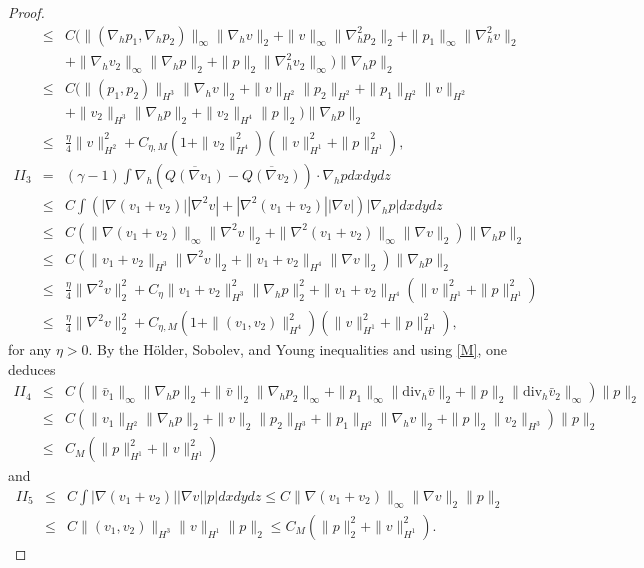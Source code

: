 \documentclass[12pt,reqno]{amsart}
\numberwithin{equation}{section}
\begin{document}
\begin{proof}
\begin{eqnarray*}
    &\leq&C(\|(\nabla_hp_1,\nabla_hp_2)\|_\infty\|\nabla_hv\|_2+\|v\|_\infty\|\nabla_h^2p_2\|_2+\|p_1\|_\infty\|\nabla_h^2v\|_2\\
    &&+\|\nabla_hv_2\|_\infty\|\nabla_hp\|_2+\|p\|_2\|\nabla_h^2v_2\|_\infty)\|\nabla_hp\|_2\\
    &\leq&C(\|(p_1,p_2)\|_{H^3}\|\nabla_hv\|_2+\|v\|_{H^2}\|p_2\|_{H^2}+\|p_1\|_{H^2}\|v\|_{H^2}\\
    &&+\|v_2\|_{H^3}\|\nabla_hp\|_2+\|v_2\|_{H^4}\|p\|_2)\|\nabla_hp\|_2\\
    &\leq&\frac\eta4\|v\|_{H^2}^2+C_{\eta,M}(1+\|v_2\|_{H^4}^2)(\|v\|_{H^1}^2+\|p\|_{H^1}^2),\\
    II_3&=&(\gamma-1)\int \nabla_h\left(\overline{Q(\nabla v_1)}-\overline{Q(\nabla v_2)}\right)\cdot\nabla_hp dxdydz\\
    &\leq&C\int(|\nabla(v_1+v_2)||\nabla^2v|+|\nabla^2(v_1+v_2)||\nabla v|)|\nabla_hp|dxdydz\\
    &\leq&C(\|\nabla(v_1+v_2)\|_\infty\|\nabla^2v\|_2+\|\nabla^2(v_1+v_2)\|_\infty\|\nabla v\|_2)\|\nabla_hp\|_2\\
    &\leq&C(\|v_1+v_2\|_{H^3}\|\nabla^2v\|_2+\|v_1+v_2\|_{H^4}\|\nabla v\|_2)\|\nabla_hp\|_2\\
    &\leq&\frac\eta4\|\nabla^2v\|_2^2+C_\eta\|v_1+v_2\|_{H^3}^2\|\nabla_hp\|_2^2+\|v_1+v_2\|_{H^4}(\|v\|_{H^1}^2+\|p\|_{H^1}^2)\\
    &\leq&\frac\eta4\|\nabla^2v\|_2^2+C_{\eta,M}\left(1+\|(v_1,v_2)\|_{H^4}^2\right)(\|v\|_{H^1}^2+\|p\|_{H^1}^2),
  \end{eqnarray*}
  for any $\eta>0$.
  By the H\"older, Sobolev, and Young inequalities and using \eqref{M}, one deduces
  \begin{eqnarray*}
    II_4
    &\leq&C(\|\bar v_1\|_\infty\|\nabla_hp\|_2+\|\bar v\|_2\|\nabla_hp_2\|_\infty+\|p_1\|_\infty\|\text{div}_h\bar v\|_2+
    \|p\|_2\|\text{div}_h\bar v_2\|_\infty)\|p\|_2\\
    &\leq&C(\|v_1\|_{H^2}\|\nabla_hp\|_2+\|v\|_2\|p_2\|_{H^3}+\|p_1\|_{H^2}\|\nabla_hv\|_2+\|p\|_2\|v_2\|_{H^3})\|p\|_2\\
    &\leq&C_M(\|p\|_{H^1}^2+\|v\|_{H^1}^2)
  \end{eqnarray*}
  and
  \begin{eqnarray*}
    II_5&\leq&C\int|\nabla(v_1+v_2)||\nabla v||p|dxdydz\leq C\|\nabla(v_1+v_2)\|_\infty\|\nabla v\|_2\|p\|_2\\
    &\leq&C\|(v_1,v_2)\|_{H^3}\|v\|_{H^1}\|p\|_2\leq C_M(\|p\|_2^2+\|v\|_{H^1}^2).
  \end{eqnarray*}

\end{proof}
\end{document}

